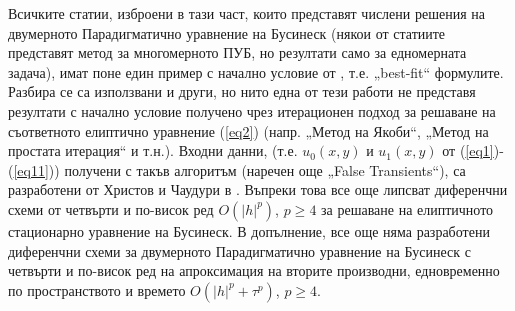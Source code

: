 \documentclass[a5paper]{article}
\newcommand{\rf}[1]{(\ref{#1})}
\theoremstyle{remark}
\begin{document}
\begin{large}
Всичките статии, изброени в тази част, които представят числени решения на двумерното Парадигматично уравнение на Бусинеск (някои от статиите представят метод за многомерното ПУБ, но резултати само за едномерната задача), имат поне един пример с начално условие от \cite{ref15}, т.е. „best-fit“ формулите. Разбира се са използвани и други, но нито една от тези работи не представя резултати с начално условие получено чрез итерационен подход за решаване на съответното елиптично уравнение \rf{eq2} (напр. „Метод на Якоби“, „Метод на простата итерация“ и т.н.). Входни данни, (т.е. $u_0(x,y)$ и $u_1(x,y)$ от \rf{eq1}-\rf{eq11}) получени с такъв алгоритъм (наречен още „False Transients“), са разработени от Христов и Чаудури в \cite{ref117,ref116}. Въпреки това все още липсват диференчни схеми от четвърти и по-висок ред $O(|h|^p)$, $p \ge 4$ за решаване на елиптичното стационарно уравнение на Бусинеск. В допълнение, все още няма разработени диференчни схеми за двумерното Парадигматично уравнение на Бусинеск с четвърти и по-висок ред на апроксимация на вторите производни, едновременно по пространството и времето $O(|h|^p + \tau^p)$, $p \ge 4$.


\end{large}
\end{document}

